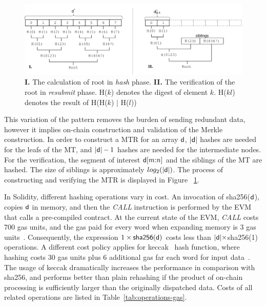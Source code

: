 \begin{figure}[h]
    \begin{center}
        \includegraphics[width=1\linewidth]{figures/merkle-har.pdf}
    \end{center}
    \caption{\textbf{I.} The calculation of root in \emph{hash} phase.
    \textbf{II.} The verification of the root in \emph{resubmit} phase.
    \textsf{H}($k$) denotes the digest of element $k$. \textsf{H}($kl$) denotes the
    result of \textsf{H}(\textsf{H}($k$) $|$ \textsf{H}($l$))}
    \label{fig:merkle-har}
\end{figure}

This variation of the pattern removes the burden of sending redundant data,
however it implies on-chain construction and validation of the Merkle
construction. In order to construct a MTR for an array $\mathsf{d}$,
$|\mathsf{d}|$ hashes are needed for the leafs of the MT, and $|\mathsf{d}| -
1$ hashes are needed for the intermediate nodes. For the verification, the
segment of interest $\mathsf{d}[m{:}n]$ and the siblings of the MT are hashed.
The size of siblings is approximately $log_2(|\mathsf{d}|)$. The process of
constructing and verifying the MTR is displayed in Figure
~\ref{fig:merkle-har}.

In Solidity, different hashing operations vary in cost. An invocation of
\textsf{sha256}($\mathsf{d}$), copies $\mathsf{d}$ in memory, and then the
\emph{CALL} instruction is performed by the EVM that calls a pre-compiled
contract. At the current state of the EVM, \emph{CALL} costs 700 gas units, and
the gas paid for every word when expanding memory is 3 gas units~\cite{wood}.
Consequently, the expression $1 \times \textsf{sha256}(\mathsf{d})$ costs less than
$|\mathsf{d}| \times $\textsf{sha256}(1) operations. A different cost policy applies
for \textsf{keccak}~\cite{keccak} hash function, where hashing costs 30 gas
units plus 6 additional gas far each word for input data~\cite{wood}. The usage
of \textsf{keccak} dramatically increases the performance in comparison with
\textsf{sha256}, and performs better than plain rehashing if the product of
on-chain processing is sufficiently larger than the originally dispatched data.
Costs of all related operations are listed in Table~\ref{tab:operations-gas}.

